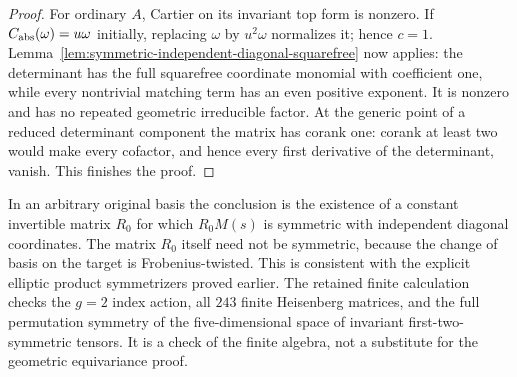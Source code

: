 \begin{proof}
For ordinary $A$, Cartier on its invariant top form is nonzero.
If $C_{\rm abs}(\omega)=u\omega$ initially, replacing $\omega$
by $u^2\omega$ normalizes it; hence $c=1$.
Lemma~\ref{lem:symmetric-independent-diagonal-squarefree} now
applies: the determinant has the full squarefree coordinate
monomial with coefficient one, while every nontrivial matching
term has an even positive exponent. It is nonzero and has no
repeated geometric irreducible factor.
At the generic point of a reduced determinant component the
matrix has corank one: corank at least two would make every
cofactor, and hence every first derivative of the determinant,
vanish. This finishes the proof.
\end{proof}

\begin{remark}
In an arbitrary original basis the conclusion is the existence of
a constant invertible matrix $R_0$ for which $R_0M(s)$ is symmetric
with independent diagonal coordinates. The matrix $R_0$ itself
need not be symmetric, because the change of basis on the target
is Frobenius-twisted. This is consistent with the explicit elliptic
product symmetrizers proved earlier.
The retained finite calculation
checks the $g=2$ index action, all $243$ finite Heisenberg matrices,
and the full permutation symmetry of the five-dimensional space of
invariant first-two-symmetric tensors. It is a check of the finite
algebra, not a substitute for the geometric equivariance proof.
\end{remark}
